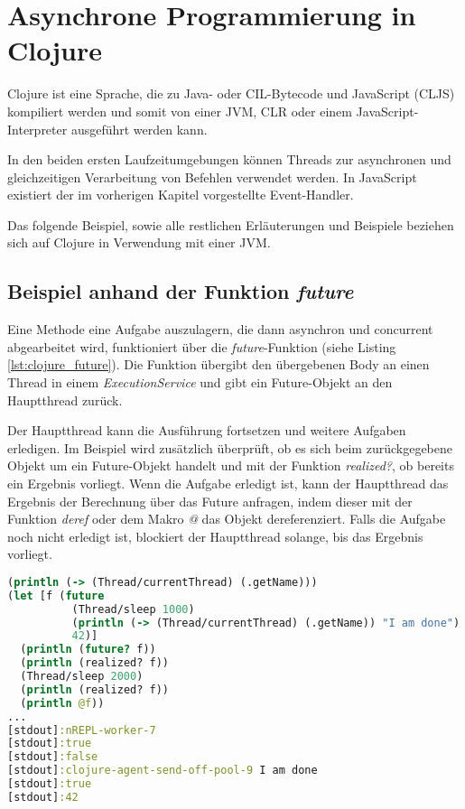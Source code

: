 \section{Asynchrone Programmierung in Clojure}

Clojure ist eine Sprache, die zu Java- oder CIL-Bytecode und JavaScript (\acl{CLJS}) kompiliert werden und somit von einer \ac{JVM}, \ac{CLR} oder einem JavaScript-Interpreter ausgeführt werden kann.

In den beiden ersten Laufzeitumgebungen können Threads zur asynchronen und gleichzeitigen Verarbeitung von Befehlen verwendet werden. In JavaScript existiert der im vorherigen Kapitel vorgestellte Event-Handler.

Das folgende Beispiel, sowie alle restlichen Erläuterungen und Beispiele beziehen sich auf Clojure in Verwendung mit einer \ac{JVM}.

\subsection*{Beispiel anhand der Funktion \textit{future}}
Eine Methode eine Aufgabe auszulagern, die dann asynchron und concurrent abgearbeitet wird, funktioniert über die \textit{future}-Funktion (siehe Listing \ref{lst:clojure_future}). Die Funktion übergibt den übergebenen Body an einen Thread in einem \textit{ExecutionService} und gibt ein Future-Objekt an den Hauptthread zurück.

Der Hauptthread kann die Ausführung fortsetzen und weitere Aufgaben erledigen. Im Beispiel wird zusätzlich überprüft, ob es sich beim zurückgegebene Objekt um ein Future-Objekt handelt und mit der Funktion  \textit{realized?}, ob bereits ein Ergebnis vorliegt. Wenn die Aufgabe erledigt ist, kann der Hauptthread das Ergebnis der Berechnung über das Future anfragen, indem dieser mit der Funktion \textit{deref} oder dem Makro \textit{@} das Objekt dereferenziert. Falls die Aufgabe noch nicht erledigt ist, blockiert der Hauptthread solange, bis das Ergebnis vorliegt.

\begin{lstlisting}[language=Clojure,caption=Das asynchrone Ausführen von Befehlen mit der Funktion \textit{future},label=lst:clojure_future]
(println (-> (Thread/currentThread) (.getName)))
(let [f (future
          (Thread/sleep 1000)
          (println (-> (Thread/currentThread) (.getName)) "I am done")
          42)]
  (println (future? f))
  (println (realized? f))
  (Thread/sleep 2000)
  (println (realized? f))
  (println @f))
...
[stdout]:nREPL-worker-7
[stdout]:true
[stdout]:false
[stdout]:clojure-agent-send-off-pool-9 I am done
[stdout]:true
[stdout]:42
\end{lstlisting}

